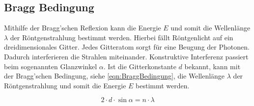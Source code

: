 \subsection{Bragg Bedingung}
Mithilfe der Bragg'schen Reflexion kann die Energie $E$ und somit die Wellenlänge $\lambda$ der Röntgenstrahlung bestimmt werden.
Hierbei fällt Röntgenlicht auf ein dreidimensionales Gitter.
Jedes Gitteratom sorgt für eine Beugung der Photonen.
Dadurch interferieren die Strahlen miteinander.
Konstruktive Interferenz passiert beim sogenannten Glanzwinkel $\alpha$.
Ist die Gitterkonstante $d$ bekannt, kann mit der Bragg'schen Bedingung, siehe \eqref{eqn:BraggBedingung},
die Wellenlänge $\lambda$ der Röntgenstrahlung und somit die Energie $E$ bestimmt werden.

\begin{equation}
    \label{eqn:BraggBedingung}
    2 \cdot d \cdot \sin\alpha = n \cdot \lambda
\end{equation}